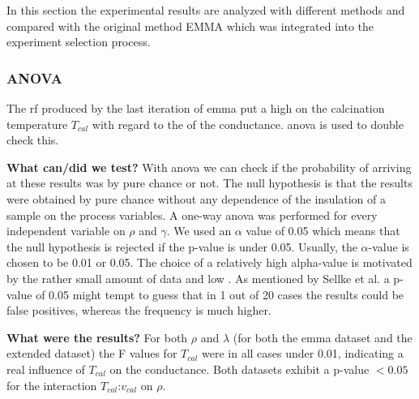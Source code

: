 \label{sec:res-post-emma}
In this section the experimental results are analyzed with different methods and compared with the original method EMMA which was integrated into the experiment selection process. 
\subsubsection{ANOVA}\label{sec:res-anova}
The \gls{rf} produced by the last iteration of \gls{emma} put a high  
on the calcination temperature $T_{cal}$ with regard to the  of the conductance. 
\Gls{anova} is used to double check this. 

\textbf{What can/did we test?}
With \gls{anova} we can check if the probability of arriving at these results was by pure chance or not. 
The null hypothesis is that the results were obtained by pure chance without any dependence of the insulation of a sample on the process variables.
A one-way \gls{anova} was performed for every independent variable on $\rho$ and $\gamma$. 
We used an $\alpha$ value of 0.05 which means that 
the null hypothesis is rejected if the p-value is under 0.05. 
Usually, the $\alpha$-value is chosen to be 0.01 or 0.05\cite{hoffman2020concept,sellke2001pvalues}.
The choice of a relatively high alpha-value is motivated by the rather small amount of data and low .
As mentioned by Sellke et al.\cite{sellke2001pvalues} a p-value of 0.05 might tempt 
to guess that in 1 out of 20 cases the results could be false positives, 
whereas the frequency is much higher. 

\textbf{What were the results?}
For both $\rho$ and $\lambda$ (for both the \gls{emma} dataset and the extended dataset) 
the F values for $T_{cal}$ were in all cases under 0.01, 
indicating a real influence of $T_{cal}$ on the conductance.
Both datasets exhibit a p-value $< 0.05$ for the interaction $T_{cal}$:$v_{cal}$ on $\rho$.

